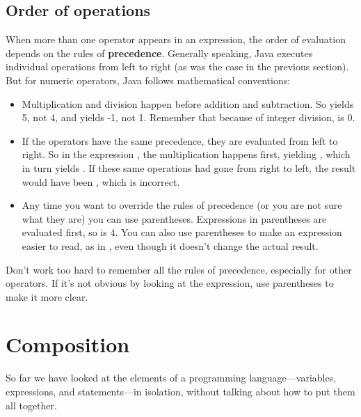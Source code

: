 \subsection{Order of operations}


When more than one operator appears in an expression, the order of evaluation depends on the rules of {\bf precedence}.
Generally speaking, Java executes individual operations from left to right (as was the case in the previous section).
But for numeric operators, Java follows mathematical conventions:

\begin{itemize}

\item Multiplication and division happen before addition and subtraction.
So  yields 5, not 4, and  yields -1, not 1.
Remember that because of integer division,  is 0.

\item If the operators have the same precedence, they are evaluated from left to right.
So in the expression , the multiplication happens first, yielding , which in turn yields .
If these same operations had gone from right to left, the result would have been , which is incorrect.

\item Any time you want to override the rules of precedence (or you are not sure what they are) you can use parentheses.
Expressions in parentheses are evaluated first, so  is 4.
You can also use parentheses to make an expression easier to read, as in , even though it doesn't change the actual result.

\end{itemize}

Don't work too hard to remember all the rules of precedence, especially for other operators.
If it's not obvious by looking at the expression, use parentheses to make it more clear.


\section{Composition}


So far we have looked at the elements of a programming language---variables, expressions, and statements---in isolation, without talking about how to put them all together.

